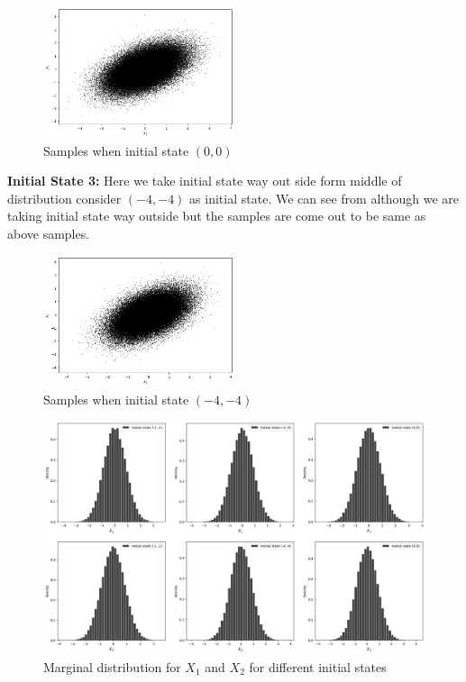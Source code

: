 \begin{example}
    \begin{figure}[H]
        \centering
        \includegraphics[width=0.5\textwidth]{images/gibbs/ex1-init2.png}
        \caption{Samples when initial state $(0,0)$}
    \end{figure}

    \textbf{Initial State 3:} Here we take initial state way out side form middle of distribution consider $ (-4,-4) $ as initial state. We can see from  although we are taking initial state way outside but the samples are come out to be same as above samples. 


    \begin{figure}[H]
        \centering
        \includegraphics[width=0.5\textwidth]{images/gibbs/ex1-init3.png}
        \caption{Samples when initial state $(-4,-4)$}
        \label{fig:gb ex1 sample 3}
    \end{figure}

    \begin{figure}[H]
        \centering
        \includegraphics[width=1\textwidth]{images/gibbs/ex1-marginal-distributions.png}
        \caption{Marginal distribution for $ X_1 $ and $ X_2 $ for different initial states}
    \end{figure}

\end{example}

